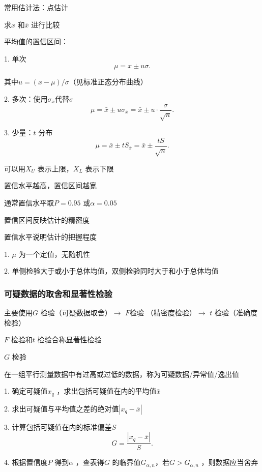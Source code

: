 \begin{notation}
    常用估计法：点估计

    求$x$ 和$\bar{x}$ 进行比较
\end{notation}
平均值的置信区间：

1. 单次
 \[
    \mu=x\pm u\sigma
.\] 

其中$u=(x-\mu)/\sigma$（见标准正态分布曲线）

2. 多次：使用$\sigma_{\bar{x}}$代替$\sigma$
\[
    \mu=\bar{x} \pm u\sigma_{\bar{x}}=\bar{x}\pm u\cdot \frac{\sigma}{\sqrt{n} }
.\] 

3. 少量：$t$ 分布
\[
    \mu=\bar{x}\pm tS_{\bar{x}}=\bar{x}\pm\frac{tS}{\sqrt{n} }
.\] 

可以用$X_{U}$ 表示上限，$X_{L}$ 表示下限

\begin{notation}
    置信水平越高，置信区间越宽

    通常置信水平取$P=0.95$ 或$\alpha=0.05$ 

    置信区间反映估计的精密度

    置信水平说明估计的把握程度
\end{notation}
\begin{notation}
    1. $\mu$ 为一个定值，无随机性

    2. 单侧检验大于或小于总体均值，双侧检验同时大于和小于总体均值
\end{notation}
\subsubsection{可疑数据的取舍和显著性检验}%
\label{subsub:可疑数据的取舍和显著性检验}
主要使用$G$ 检验（可疑数据取舍）$\to $ $F$检验 （精密度检验）$\to $ $t$ 检验（准确度检验）
\begin{notation}
    $F$ 检验和$t$ 检验合称显著性检验
\end{notation}

\begin{notation}
    $G$ 检验

    在一组平行测量数据中有过高或过低的数据，称为可疑数据/异常值/逸出值

    1. 确定可疑值$x_{q}$ ，求出包括可疑值在内的平均值$\bar{x}$

    2. 求出可疑值与平均值之差的绝对值$\left| x_{q}-\bar{x} \right| $ 

    3. 计算包括可疑值在内的标准偏差$S$ 
    \[
        G=\frac{\left| x_{q}-\bar{x} \right| }{S}
    .\] 

    4. 根据置信度$P$ 得到$\alpha$ ，查表得$G$ 的临界值$G_{\alpha,n}$，若$G>G_{\alpha,n}$ ，则数据应当舍弃
\end{notation}

